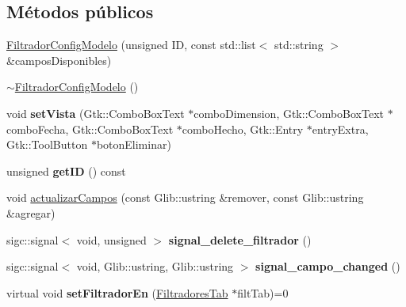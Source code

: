 \subsection*{\-Métodos públicos}
\begin{DoxyCompactItemize}
\item 
\hyperlink{classFiltradorConfigModelo_aa4bf89d3b9c17421b1885e2666b8d76c}{\-Filtrador\-Config\-Modelo} (unsigned \-I\-D, const std\-::list$<$ std\-::string $>$ \&campos\-Disponibles)
\item 
\hyperlink{classFiltradorConfigModelo_ae3fe5e02af21a1724d2abb940266ac64}{$\sim$\-Filtrador\-Config\-Modelo} ()
\item 
\hypertarget{classFiltradorConfigModelo_abf83fdb10b4c05a534a72dece6526f58}{void {\bfseries set\-Vista} (\-Gtk\-::\-Combo\-Box\-Text $\ast$combo\-Dimension, \-Gtk\-::\-Combo\-Box\-Text $\ast$combo\-Fecha, \-Gtk\-::\-Combo\-Box\-Text $\ast$combo\-Hecho, \-Gtk\-::\-Entry $\ast$entry\-Extra, \-Gtk\-::\-Tool\-Button $\ast$boton\-Eliminar)}\label{classFiltradorConfigModelo_abf83fdb10b4c05a534a72dece6526f58}

\item 
\hypertarget{classFiltradorConfigModelo_abcd792426ccc0f95c6241ddf3fffdcf7}{unsigned {\bfseries get\-I\-D} () const }\label{classFiltradorConfigModelo_abcd792426ccc0f95c6241ddf3fffdcf7}

\item 
void \hyperlink{classFiltradorConfigModelo_a234d1f37a3f7ed8df4a3639dc7eeb319}{actualizar\-Campos} (const \-Glib\-::ustring \&remover, const \-Glib\-::ustring \&agregar)
\item 
\hypertarget{classFiltradorConfigModelo_a388b04e618a004da441f04519d55381f}{sigc\-::signal$<$ void, unsigned $>$ {\bfseries signal\-\_\-delete\-\_\-filtrador} ()}\label{classFiltradorConfigModelo_a388b04e618a004da441f04519d55381f}

\item 
\hypertarget{classFiltradorConfigModelo_a35853241db6782cf6d3172621221e0ad}{sigc\-::signal$<$ void, \*
\-Glib\-::ustring, \-Glib\-::ustring $>$ {\bfseries signal\-\_\-campo\-\_\-changed} ()}\label{classFiltradorConfigModelo_a35853241db6782cf6d3172621221e0ad}

\item 
\hypertarget{classFiltradorConfigModelo_a8dd955d0b124af9bf564b1890e8a3ab1}{virtual void {\bfseries set\-Filtrador\-En} (\hyperlink{classFiltradoresTab}{\-Filtradores\-Tab} $\ast$filt\-Tab)=0}\label{classFiltradorConfigModelo_a8dd955d0b124af9bf564b1890e8a3ab1}


\end{DoxyCompactItemize}

